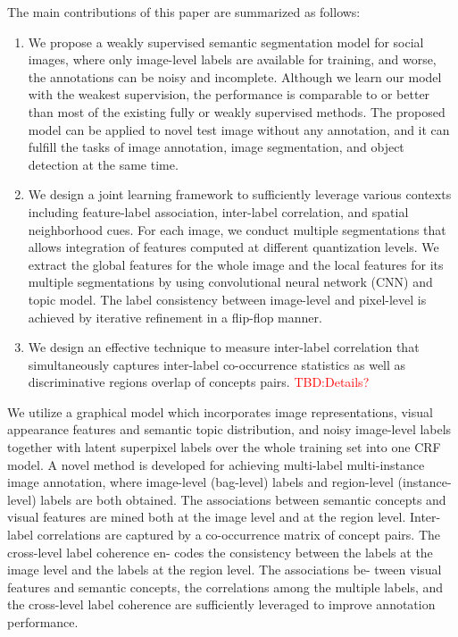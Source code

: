 The main contributions of this paper are summarized as follows:
\begin{enumerate}
  \item We propose a weakly supervised semantic segmentation model for social images, where only image-level labels are available for training, and worse, the annotations can be noisy and incomplete. Although we learn our model with the weakest supervision, the performance is comparable to or better than most of the existing fully or weakly supervised methods. The  proposed model can be applied to novel test image without any annotation, and it can fulfill the tasks of image annotation, image segmentation, and object detection at the same time.
  \item We design a joint learning framework to sufficiently leverage various contexts including  feature-label association, inter-label correlation, and spatial neighborhood cues. For each image, we conduct multiple segmentations that allows integration of features computed at different quantization levels.  We extract the global  features for the whole image and the local features for its multiple segmentations by using convolutional neural network (CNN) and topic model.  The label consistency between image-level and pixel-level is achieved by iterative refinement   in a flip-flop manner.
  \item We design an effective technique to measure inter-label correlation that simultaneously captures inter-label co-occurrence statistics as well as discriminative regions overlap of concepts pairs. {\textcolor{red}{TBD:Details?}}
\end{enumerate}

\if

 We utilize a graphical model which incorporates image representations, visual appearance features and semantic topic distribution, and noisy image-level labels together with latent superpixel labels over the whole training set into one CRF model. A novel method is developed for achieving multi-label multi-instance image annotation, where image-level (bag-level) labels and region-level (instance-level) labels are both obtained. The associations between semantic concepts and visual features are mined both at the image level and at the region level. Inter-label correlations are captured by a co-occurrence matrix of concept pairs. The cross-level label coherence en- codes the consistency between the labels at the image level and the labels at the region level. The associations be- tween visual features and semantic concepts, the correlations among the multiple labels, and the cross-level label coherence are sufficiently leveraged to improve annotation performance.

